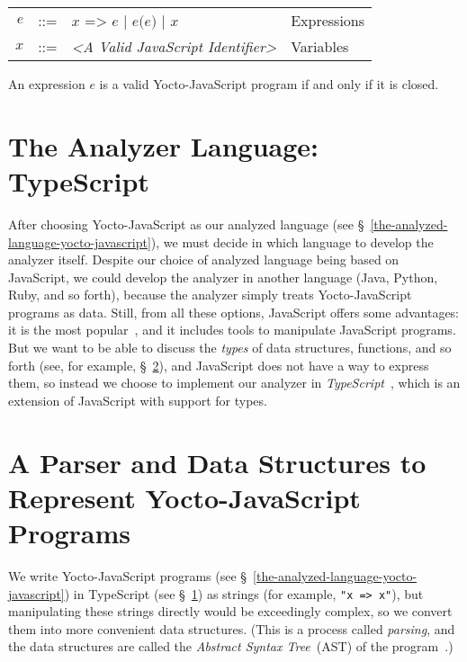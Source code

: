 \documentclass[12pt, oneside]{book}
\begin{document}
\begin{center}
\begin{tabular}{rcll}
$e$ & ::= & $x\texttt{ => }e$ | $e\texttt{(}e\texttt{)}$ | $x$ & Expressions \\
$x$ & ::= & \emph{<A Valid JavaScript Identifier>} & Variables \\
\end{tabular}
\end{center}

An expression $e$ is a valid Yocto-JavaScript program if and only if it is closed.

\section{The Analyzer Language: TypeScript}
\label{the-analyzer-language-typescript}

After choosing Yocto-JavaScript as our analyzed language (see §~\ref{the-analyzed-language-yocto-javascript}), we must decide in which language to develop the analyzer itself. Despite our choice of analyzed language being based on JavaScript, we could develop the analyzer in another language (Java, Python, Ruby, and so forth), because the analyzer simply treats Yocto-JavaScript programs as data. Still, from all these options, JavaScript offers some advantages: it is the most popular~\cite{stack-overflow-developer-survey, jet-brains-developer-survey}, and it includes tools to manipulate JavaScript programs. But we want to be able to discuss the \emph{types} of data structures, functions, and so forth (see, for example, §~\ref{a-parser-and-data-structures-to-represent-yocto-javascript programs}), and JavaScript does not have a way to express them, so instead we choose to implement our analyzer in \emph{TypeScript}~\cite{typescript, typescript-deep-dive, understanding-typescript}, which is an extension of JavaScript with support for types.

\section{A Parser and Data Structures to Represent Yocto-JavaScript Programs}
\label{a-parser-and-data-structures-to-represent-yocto-javascript programs}

We write Yocto-JavaScript programs (see §~\ref{the-analyzed-language-yocto-javascript}) in TypeScript (see §~\ref{the-analyzer-language-typescript}) as strings (for example, \texttt{"x => x"}), but manipulating these strings directly would be exceedingly complex, so we convert them into more convenient data structures. (This is a process called \emph{parsing}, and the data structures are called the \emph{Abstract Syntax Tree}~(AST) of the program~\cite[§~4]{dragon-book}.)
\end{document}
